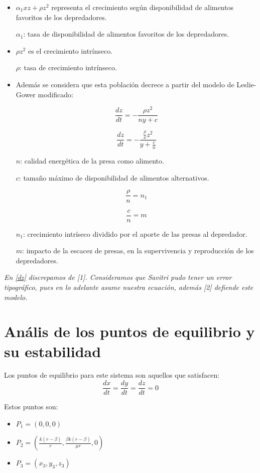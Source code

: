 \documentclass{wscpaperproc}
\theoremstyle{wsc}
\begin{document}
\begin{itemize}
	\item $\alpha_1 xz+\rho z^2$ representa el crecimiento según disponibilidad de alimentos favoritos de los depredadores.

	      $\alpha_1$: tasa de disponibilidad de alimentos favoritos de los depredadores.

	      \vspace*{0.3cm}

	\item $\rho z^2$ es el crecimiento intrínseco.

	      $\rho$: tasa de crecimiento intrínseco.

	\item Además se considera que esta población decrece a partir del modelo de Leslie-Gower modificado:

	      $$\frac{dz}{dt} =-\frac{\rho z^2}{n y+c}$$

	      $$\frac{dz}{dt} =-\frac{\frac{\rho}{x} z^2}{y+\frac{c}{n}}$$

	      $n$: calidad energética de la presa como alimento.

	      $c$: tamaño máximo de disponibilidad de alimentos alternativos.

	      \vspace*{0.5cm}

	      $$\frac{\rho}{n}=n_1$$

	      $$\frac{c}{n}=m$$

	      $n_1$: crecimiento intríseco dividido por el aporte de las presas al depredador.

	      $m$: impacto de la escacez de presas, en la supervivencia y reproducción de los depredadores.
\end{itemize}
\vspace*{3cm}
{\it En \ref*{dz} discrepamos de [1]. Consideramos que Savitri pudo tener un error tipográfico, pues en lo adelante asume nuestra
ecuación, además [2] defiende este modelo.}

\section*{Anális de los puntos de equilibrio y su estabilidad}

Los puntos de equilibrio para este sistema son aquellos que satisfacen:
$$\frac{dx}{dt}=\frac{dy}{dt}=\frac{dz}{dt}=0$$

Estos puntos son:
\begin{itemize}
	\item $P_1=(0, 0, 0)$
	\item $P_2=(\frac{k(r-\beta)}{r}, \frac{\beta k(r-\beta)}{\mu r}, 0)$
	\item $P_3=(x_3, y_3, z_3)$
\end{itemize}
\end{document}
